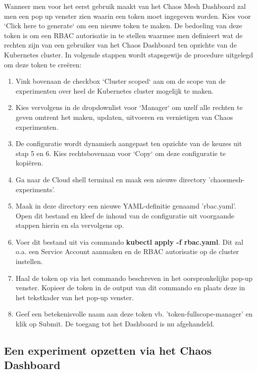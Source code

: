 Wanneer men voor het eerst gebruik maakt van het Chaos Mesh Dashboard zal men een pop up venster zien waarin een token moet ingegeven worden. Kies voor `Click here to generate` om een nieuwe token te maken. De bedoeling van deze token is om een RBAC autorisatie in te stellen waarmee men definieert wat de rechten zijn van een gebruiker van het Chaos Dashboard ten opzichte van de Kubernetes cluster. In volgende stappen wordt stapsgewijs de procedure uitgelegd om deze token te creëren:
\begin{enumerate}
    \item Vink bovenaan de checkbox `Cluster scoped` aan om de scope van de experimenten over heel de Kubernetes cluster mogelijk te maken.
    \item Kies vervolgens in de dropdownlist voor `Manager` om uzelf alle rechten te geven omtrent het maken, updaten, uitvoeren en vernietigen van Chaos experimenten.
    \item De configuratie wordt dynamisch aangepast ten opzichte van de keuzes uit stap 5 en 6. Kies rechtsbovenaan voor `Copy` om deze configuratie te kopiëren.
    \item Ga naar de Cloud shell terminal en maak een nieuwe directory 'chaosmesh-experiments'. 
    \item Maak in deze directory een nieuwe YAML-definitie genaamd 'rbac.yaml'. Open dit bestand en kleef de inhoud van de configuratie uit voorgaande stappen hierin en sla vervolgens op.
    \item Voer dit bestand uit via commando {\bf kubectl apply -f rbac.yaml}. Dit zal o.a. een Service Account aanmaken en de RBAC autorisatie op de cluster instellen.
    \item Haal de token op via het commando beschreven in het oorspronkelijke pop-up venster. Kopieer de token in de output van dit commando en plaats deze in het tekstkader van het pop-up venster.
    \item Geef een betekenisvolle naam aan deze token vb. 'token-fullscope-manager' en klik op Submit. De toegang tot het Dashboard is nu afgehandeld.    
\end{enumerate}

\subsection{Een experiment opzetten via het Chaos Dashboard}


